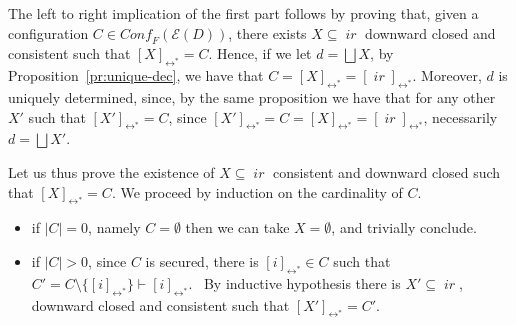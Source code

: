 \documentclass[conference]{IEEEtran}
\renewenvironment{proof}{\begin{IEEEproof}}{\end{IEEEproof}}
\newcommand{\compact}[1]{\ensuremath{\mathop{\mathsf{K}({#1})}}}
\newcommand{\ir}[1]{\ensuremath{\mathop{\mathit{ir}({#1})}}}
\newcommand{\eqclass}[2][]{\ensuremath{[{#2}]_{\scriptscriptstyle {#1}}}}
\newcommand{\eqclassir}[1]{\ensuremath{\eqclass[\leftrightarrow^*]{#1}}}
\newcommand{\zev}[0]{\ensuremath{\mathcal{E}}}
\newcommand{\ev}[1]{\ensuremath{\zev({#1})}}
\newcommand{\conff}[1]{\ensuremath{\mathit{Conf_F}({#1})}}
\begin{document}
\begin{proof}
  The left to right implication {of the first part} follows by proving that, given a
  configuration $C \in \conff{\ev{D}}$, there exists
  $X \subseteq \ir{D}$ downward closed and consistent such that
  $\eqclassir{X} = C$. Hence, if we let $d = \bigsqcup X$, by
  Proposition~\ref{pr:unique-dec}, we have that
  $C = \eqclassir{X} = \eqclassir{\ir{d}}$. Moreover, $d$ is uniquely
  determined, since, by the same proposition we have that for any
  other $X'$ such that $\eqclassir{X'} = C$, since
  $\eqclassir{X'} = C = \eqclassir{X} = \eqclassir{\ir{d}}$,
  necessarily $d = \bigsqcup X'$.
  

  Let us thus prove the existence of $X \subseteq \ir{D}$ consistent
  and downward closed such that $\eqclassir{X} = C$.  
  We proceed by induction on the cardinality of $C$.

  
  \begin{itemize}
  \item if $|C| = 0$, namely $C = \emptyset$ then we can take $X= \emptyset$,
    and trivially conclude.

  \item if $|C|>0$, since $C$ is secured, there is
    $\eqclassir{i} \in C$ such that
    $C' = C \setminus \{ \eqclassir{i} \} \vdash \eqclassir{i}$.\
    By inductive hypothesis there is $X' \subseteq \ir{D}$, downward
    closed and consistent such that $\eqclassir{X'} = C'$.


\end{itemize}
\end{proof}
\end{document}
